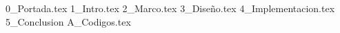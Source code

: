 \documentclass[a4paper,12pt,twoside]{all-in-one} %
\begin{document}

{0_Portada.tex}
{
  \hypersetup{hidelinks}
  \tableofcontents
}
\clearpage
{1_Intro.tex}
{2_Marco.tex}
\clearpage
{3_Diseño.tex}
\clearpage
{4_Implementacion.tex}
\clearpage
{5_Conclusion}
\appendix
\setcounter{listing}{0}
\renewcommand{\thelisting}{\thesection\arabic{listing}}
\setcounter{table}{0}
\renewcommand{\thetable}{\thesection\arabic{table}}
\setcounter{figure}{0}
\renewcommand{\thefigure}{\thesection\arabic{figure}}
{A_Codigos.tex}

\clearpage
\pagestyle{\auxsettings}
\printbibliography[heading=bibintoc]
\end{document}
